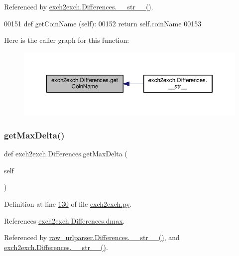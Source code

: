 Referenced by \hyperlink{exch2exch_8py_source_l00154}{exch2exch.\+Differences.\+\_\+\+\_\+str\+\_\+\+\_\+()}.


\begin{DoxyCode}
00151     \textcolor{keyword}{def }getCoinName (self):
00152         \textcolor{keywordflow}{return} self.coinName
00153         
\end{DoxyCode}
Here is the caller graph for this function\+:
\nopagebreak
\begin{figure}[H]
\begin{center}
\leavevmode
\includegraphics[width=350pt]{classexch2exch_1_1_differences_a27c3904cedfe6f58d750591c1f7c7879_icgraph}
\end{center}
\end{figure}
\mbox{\label{classexch2exch_1_1_differences_a577c9c2cbc470643f7bff8fc50295816}} 
\subsubsection{\texorpdfstring{get\+Max\+Delta()}{getMaxDelta()}}
{\footnotesize\ttfamily def exch2exch.\+Differences.\+get\+Max\+Delta (\begin{DoxyParamCaption}\item[{}]{self }\end{DoxyParamCaption})}



Definition at line \hyperlink{exch2exch_8py_source_l00130}{130} of file \hyperlink{exch2exch_8py_source}{exch2exch.\+py}.



References \hyperlink{exch2exch_8py_source_l00115}{exch2exch.\+Differences.\+dmax}.



Referenced by \hyperlink{raw__urlparser_8py_source_l00100}{raw\+\_\+urlparser.\+Differences.\+\_\+\+\_\+str\+\_\+\+\_\+()}, and \hyperlink{exch2exch_8py_source_l00154}{exch2exch.\+Differences.\+\_\+\+\_\+str\+\_\+\+\_\+()}.


